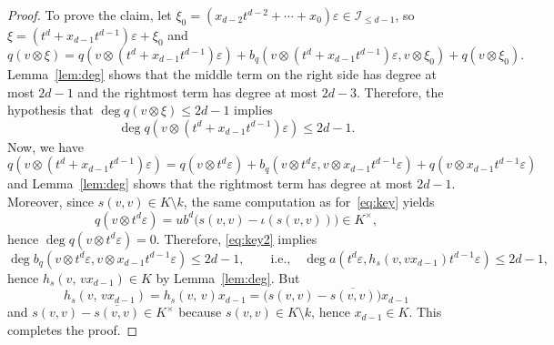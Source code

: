 \documentclass{amsart}
\newcommand{\calI}{\mathcal{I}}
\theoremstyle{remark}
\begin{document}
\begin{proof}
  To prove the claim,
  let $\xi_0=(x_{d-2}t^{d-2}+\cdots+x_0)\varepsilon\in \calI_{\leq
    d-1}$, so $\xi=(t^d+x_{d-1}t^{d-1})\varepsilon+\xi_0$ and
  \[
    q(v\otimes\xi) = q(v\otimes(t^d+x_{d-1}t^{d-1})\varepsilon) +
    b_q(v\otimes(t^d+x_{d-1}t^{d-1})\varepsilon, v\otimes\xi_0) +
    q(v\otimes\xi_0).
  \]
  Lemma~\ref{lem:deg} shows that the middle
  term on the right side has degree at most $2d-1$ and the rightmost
  term has degree at most $2d-3$. Therefore, the hypothesis that $\deg
  q(v\otimes\xi)\leq 2d-1$ implies
  \begin{equation}
    \label{eq:key2}
    \deg q(v\otimes(t^d+x_{d-1}t^{d-1})\varepsilon) \leq
    2d-1.
  \end{equation}
  Now, we have
  \[
    q(v\otimes(t^d+x_{d-1}t^{d-1})\varepsilon)=q(v\otimes
    t^d\varepsilon) + b_q(v\otimes t^d\varepsilon, v\otimes
    x_{d-1}t^{d-1}\varepsilon) + q(v\otimes x_{d-1}t^{d-1}\varepsilon)
  \]
  and Lemma~\ref{lem:deg} shows that the rightmost term has degree at
  most $2d-1$. Moreover, since $s(v,v)\in K\setminus
  k$, the same computation as for~\eqref{eq:key} yields
  \[
    q(v\otimes t^d\varepsilon) = ub^d\bigl(s(v,v)-\iota(s(v,v))\bigr)
    \in K^\times,
  \]
  hence $\deg q(v\otimes t^d\varepsilon) = 0$. Therefore,
  \eqref{eq:key2} implies
  \[
    \deg b_q(v\otimes t^d\varepsilon,v\otimes
    x_{d-1}t^{d-1}\varepsilon)\leq 2d-1,
    \qquad\text{i.e.,}\quad
    \deg a(t^d\varepsilon, h_s(v,vx_{d-1})t^{d-1}\varepsilon) \leq
    2d-1, 
  \]
  hence $h_s(v,\,vx_{d-1})\in K$ by
  Lemma~\ref{lem:deg}. But
  \[
    h_s(v,\,vx_{d-1}) = h_s(v,\,v)x_{d-1} = \bigl(s(v,v) -
    \overline{s(v,v)}\bigr) x_{d-1}
  \]
  and $s(v,v)-\overline{s(v,v)}\in K^\times$ because $s(v,v)\in
  K\setminus k$, hence $x_{d-1}\in K$. This completes the proof.
\end{proof}
\end{document}
